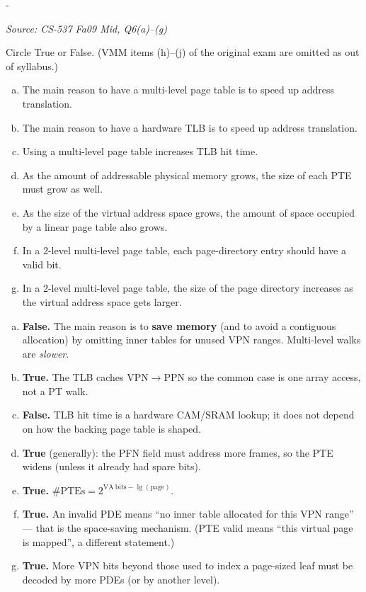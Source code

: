 \documentclass[11pt,a4paper]{article}
\makeatletter
\newcommand{\keepspace}[1]{\par\penalty-100\begingroup
  \setlength{\dimen@}{#1}\dimen@ii\pagegoal\advance\dimen@ii-\pagetotal
  \ifdim\dimen@>\dimen@ii\ifdim\dimen@ii>\z@\vfil\fi\break\fi\endgroup}
\newcounter{qn}[section]
\newenvironment{Qn}[4]{%
  \refstepcounter{qn}\keepspace{7\baselineskip}%
  \begin{tcolorbox}[qboxstyle, title={Q\thesection.\theqn\ \ [#1 \textbar\ #2]\ \ #4}]%
  {\footnotesize\color{g3}\textit{Source: #3}}\par\smallskip%
}{%
  \end{tcolorbox}%
}
\newenvironment{Sol}{%
  \begin{tcolorbox}[sboxstyle, title={Solution}]%
}{%
  \end{tcolorbox}\vspace{0.35em}%
}
\makeatother
\begin{document}
\begin{Qn}{Easy-Medium}{Lect 13--14}{CS-537 Fa09 Mid, Q6(a)--(g)}{T/F: why multi-level tables and TLBs exist}
Circle True or False. (VMM items (h)--(j) of the original exam are
omitted as out of syllabus.)
\begin{enumerate}[(a)]
\item The main reason to have a multi-level page table is to speed up
      address translation.
\item The main reason to have a hardware TLB is to speed up address
      translation.
\item Using a multi-level page table increases TLB hit time.
\item As the amount of addressable physical memory grows, the size of
      each PTE must grow as well.
\item As the size of the virtual address space grows, the amount of
      space occupied by a linear page table also grows.
\item In a 2-level multi-level page table, each page-directory entry
      should have a valid bit.
\item In a 2-level multi-level page table, the size of the page
      directory increases as the virtual address space gets larger.
\end{enumerate}
\end{Qn}
\begin{Sol}
\begin{enumerate}[(a)]
\item \textbf{False.} The main reason is to \textbf{save memory} (and
      to avoid a contiguous allocation) by omitting inner tables for
      unused VPN ranges. Multi-level walks are \emph{slower}.
\item \textbf{True.} The TLB caches VPN$\to$PPN so the common case is
      one array access, not a PT walk.
\item \textbf{False.} TLB hit time is a hardware CAM/SRAM lookup; it
      does not depend on how the backing page table is shaped.
\item \textbf{True} (generally): the PFN field must address more
      frames, so the PTE widens (unless it already had spare bits).
\item \textbf{True.} $\#\mathrm{PTEs}=2^{\mathrm{VA\ bits}-\lg(\mathrm{page})}$.
\item \textbf{True.} An invalid PDE means ``no inner table allocated
      for this VPN range'' --- that is the space-saving mechanism.
      (PTE valid means ``this virtual page is mapped'', a different
      statement.)
\item \textbf{True.} More VPN bits beyond those used to index a
      page-sized leaf must be decoded by more PDEs (or by another
      level).
\end{enumerate}
\end{Sol}
\end{document}
